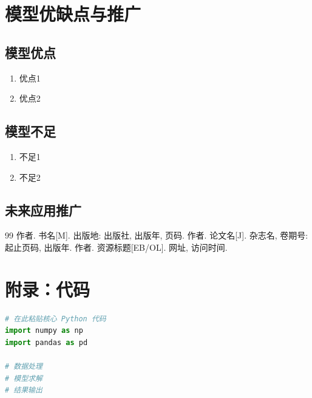 \section{模型优缺点与推广}

\subsection{模型优点}
\begin{enumerate}[label=\arabic*.]
  \item 优点1
  \item 优点2
\end{enumerate}

\subsection{模型不足}
\begin{enumerate}[label=\arabic*.]
  \item 不足1
  \item 不足2
\end{enumerate}

\subsection{未来应用推广}

\newpage
\begin{thebibliography}{99}
   作者. 书名[M]. 出版地: 出版社, 出版年, 页码.
   作者. 论文名[J]. 杂志名, 卷期号: 起止页码, 出版年.
   作者. 资源标题[EB/OL]. 网址, 访问时间.
\end{thebibliography}

\newpage
\appendix
\section{附录：代码}

\begin{lstlisting}[language=Python, caption={主要代码}]
# 在此粘贴核心 Python 代码
import numpy as np
import pandas as pd

# 数据处理
# 模型求解
# 结果输出
\end{lstlisting}


